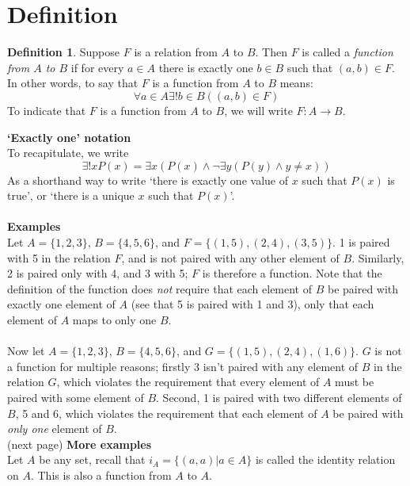 \documentclass{report}
\theoremstyle{definition}
\newtheorem*{definition}{Definition}
\begin{document}
\section{Definition}
\begin{definition}
Suppose $F$ is a relation from $A$ to $B$. Then $F$ is called a \textit{function from $A$ to $B$} if for every $a\in A$ there is exactly one $b\in B$ such that 
$(a,b)\in F$. In other words, to say that $F$ is a function from $A$ to $B$ means:
\begin{equation*}
\forall a\in A\exists!b\in B((a,b)\in F)
\end{equation*}
To indicate that $F$ is a function from $A$ to $B$, we will write $F:A\to B$.
\end{definition}
\noindent\textbf{`Exactly one' notation}\\
To recapitulate, we write 
\begin{equation*}
\exists!xP(x)=\exists x(P(x)\land\neg\exists y(P(y)\land y\neq x))
\end{equation*}
As a shorthand way to write `there is exactly one value of $x$ such that $P(x)$ is true', or `there is a unique $x$ such that $P(x)$'.\\
\vspace{1mm}\\
\textbf{Examples}\\
Let $A=\{1,2,3\}$, $B=\{4,5,6\}$, and $F=\{(1,5),(2,4),(3,5)\}$. 1 is paired with 5 in the relation $F$, and is not paired with any other element of $B$. Similarly,
2 is paired only with 4, and 3 with 5; $F$ is therefore a function. Note that the definition of the function does \textit{not} require that each element of $B$ be paired 
with exactly one element of $A$ (see that 5 is paired with 1 and 3), only that each element of $A$ maps to only one $B$.\\
\vspace{1mm}\\
Now let $A=\{1,2,3\}$, $B=\{4,5,6\}$, and $G=\{(1,5),(2,4),(1,6)\}$. $G$ is not a function for multiple reasons; firstly 3 isn't paired with any element of $B$ in the relation $G$, which violates
the requirement that every element of $A$ must be paired with some element of $B$. Second, 1 is paired with two different elements of $B$, 5 and 6, which violates the requirement that each element
of $A$ be paired with \textit{only one} element of $B$.\\
(next page)\newpage
\noindent\textbf{More examples}\\
Let $A$ be any set, recall that $i_A=\{(a,a)|a\in A\}$ is called the identity relation on $A$. This is also a function from $A$ to $A$. 
\end{document}
